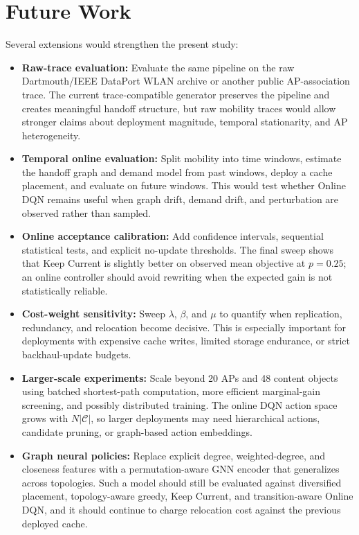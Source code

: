 \section{Future Work}

Several extensions would strengthen the present study:

\begin{itemize}
    \item \textbf{Raw-trace evaluation:} Evaluate the same pipeline on the raw Dartmouth/IEEE DataPort WLAN archive or another public AP-association trace. The current trace-compatible generator preserves the pipeline and creates meaningful handoff structure, but raw mobility traces would allow stronger claims about deployment magnitude, temporal stationarity, and AP heterogeneity.
    \item \textbf{Temporal online evaluation:} Split mobility into time windows, estimate the handoff graph and demand model from past windows, deploy a cache placement, and evaluate on future windows. This would test whether Online DQN remains useful when graph drift, demand drift, and perturbation are observed rather than sampled.
    \item \textbf{Online acceptance calibration:} Add confidence intervals, sequential statistical tests, and explicit no-update thresholds. The final sweep shows that Keep Current is slightly better on observed mean objective at \(p=0.25\); an online controller should avoid rewriting when the expected gain is not statistically reliable.
    \item \textbf{Cost-weight sensitivity:} Sweep \(\lambda\), \(\beta\), and \(\mu\) to quantify when replication, redundancy, and relocation become decisive. This is especially important for deployments with expensive cache writes, limited storage endurance, or strict backhaul-update budgets.
    \item \textbf{Larger-scale experiments:} Scale beyond 20 APs and 48 content objects using batched shortest-path computation, more efficient marginal-gain screening, and possibly distributed training. The online DQN action space grows with \(N|\mathcal{C}|\), so larger deployments may need hierarchical actions, candidate pruning, or graph-based action embeddings.
    \item \textbf{Graph neural policies:} Replace explicit degree, weighted-degree, and closeness features with a permutation-aware GNN encoder that generalizes across topologies. Such a model should still be evaluated against diversified placement, topology-aware greedy, Keep Current, and transition-aware Online DQN, and it should continue to charge relocation cost against the previous deployed cache.
\end{itemize}
